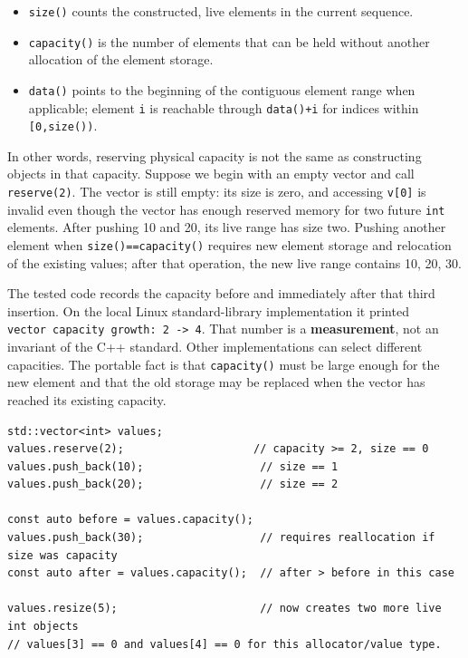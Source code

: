 \begin{itemize}
\tightlist
\item
  \texttt{size()} counts the constructed, live elements in the current sequence.
\item
  \texttt{capacity()} is the number of elements that can be held without another allocation of the element storage.
\item
  \texttt{data()} points to the beginning of the contiguous element range when applicable; element \texttt{i} is reachable through \texttt{data()+i} for indices within \texttt{{[}0,size())}.
\end{itemize}

In other words, reserving physical capacity is not the same as constructing objects in that capacity. Suppose we begin with an empty vector and call \texttt{reserve(2)}. The vector is still empty: its size is zero, and accessing \texttt{v{[}0{]}} is invalid even though the vector has enough reserved memory for two future \texttt{int} elements. After pushing 10 and 20, its live range has size two. Pushing another element when \texttt{size()==capacity()} requires new element storage and relocation of the existing values; after that operation, the new live range contains 10, 20, 30.

The tested code records the capacity before and immediately after that third insertion. On the local Linux standard-library implementation it printed \texttt{vector\ capacity\ growth:\ 2\ -\textgreater{}\ 4}. That number is a \textbf{measurement}, not an invariant of the C++ standard. Other implementations can select different capacities. The portable fact is that \texttt{capacity()} must be large enough for the new element and that the old storage may be replaced when the vector has reached its existing capacity.

\begin{verbatim}
std::vector<int> values;
values.reserve(2);                    // capacity >= 2, size == 0
values.push_back(10);                  // size == 1
values.push_back(20);                  // size == 2

const auto before = values.capacity();
values.push_back(30);                  // requires reallocation if size was capacity
const auto after = values.capacity();  // after > before in this case

values.resize(5);                      // now creates two more live int objects
// values[3] == 0 and values[4] == 0 for this allocator/value type.
\end{verbatim}

